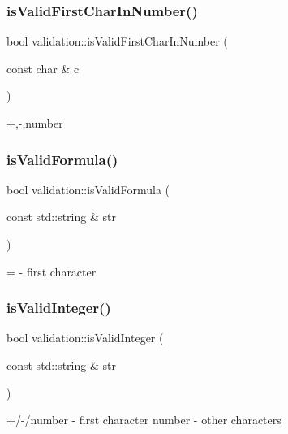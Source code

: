 \subsubsection{\texorpdfstring{is\+Valid\+First\+Char\+In\+Number()}{isValidFirstCharInNumber()}}
{\footnotesize\ttfamily bool validation\+::is\+Valid\+First\+Char\+In\+Number (\begin{DoxyParamCaption}\item[{const char \&}]{c }\end{DoxyParamCaption})}

+,-\/,number \mbox{\label{namespacevalidation_a3a4eed4024e7f1c319fe999751026392}} 
\subsubsection{\texorpdfstring{is\+Valid\+Formula()}{isValidFormula()}}
{\footnotesize\ttfamily bool validation\+::is\+Valid\+Formula (\begin{DoxyParamCaption}\item[{const std\+::string \&}]{str }\end{DoxyParamCaption})}

\textquotesingle{}=\textquotesingle{} -\/ first character \mbox{\label{namespacevalidation_a79d16e6b2fb9f26b308ba873d5c1f4ba}} 
\subsubsection{\texorpdfstring{is\+Valid\+Integer()}{isValidInteger()}}
{\footnotesize\ttfamily bool validation\+::is\+Valid\+Integer (\begin{DoxyParamCaption}\item[{const std\+::string \&}]{str }\end{DoxyParamCaption})}

+/-\//number -\/ first character number -\/ other characters \mbox{\label{namespacevalidation_a41c7f7672cfab0b1386e64e9c30aae72}} 
